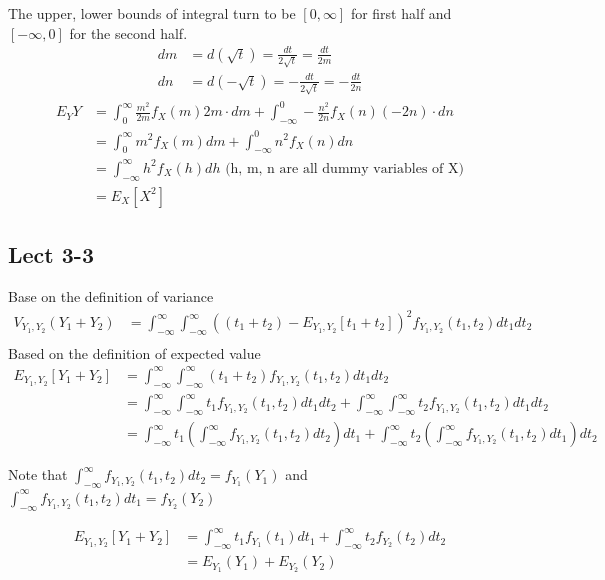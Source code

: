 \documentclass[11pt,letterpaper]{article}
\begin{document}
\noindent The upper, lower bounds of integral turn to be $[0, \infty]$ for first half and $[-\infty,0]$ for the second half.
\begin{align*}
dm &= d(\sqrt{t}) = \frac{dt}{2 \sqrt{t}} = \frac{dt}{2m}\\
dn &= d(-\sqrt{t}) = -\frac{dt}{2 \sqrt{t}} = -\frac{dt}{2n}
\end{align*}
\begin{align*}
E_Y{Y} &= \int^{\infty}_{0} \frac{m^2}{2 m}   f_X(m) 2m \cdot dm + \int_{-\infty}^{0} - \frac{n^2}{2 n}  f_X(n) (-2n) \cdot dn \\
&= \int^{\infty}_{0} m^2 f_X(m) dm + \int_{-\infty}^{0} n^2 f_X(n) dn \\
&= \int^{\infty}_{-\infty} h^2 f_X(h) dh \text{ (h, m, n are all dummy variables of X)} \\
&= E_{X}[X^2]
\end{align*}


\subsection*{Lect 3-3}
Base on the definition of variance
\begin{align*}
V_{Y_1, Y_2}(Y_1 + Y_2) &= \int_{-\infty}^{\infty} \int_{-\infty}^{\infty} ( (t_1 + t_2) - E_{Y_1, Y_2}[t_1 + t_2] )^2 f_{Y_1,Y_2}(t_1, t_2) dt_1 dt_2 \\
\end{align*}
Based on the definition of expected value
\begin{align*}
E_{Y_1, Y_2}[Y_1 + Y_2] &= \int_{-\infty}^{\infty} \int_{-\infty}^{\infty} (t_1 + t_2) f_{Y_1, Y_2}(t_1, t_2) dt_1 dt_2 \\
&= \int_{-\infty}^{\infty} \int_{-\infty}^{\infty} t_1  f_{Y_1, Y_2}(t_1, t_2) dt_1 dt_2 + \int_{-\infty}^{\infty} \int_{-\infty}^{\infty} t_2  f_{Y_1, Y_2}(t_1, t_2) dt_1 dt_2 \\
&= \int_{-\infty}^{\infty} t_1 (\int_{-\infty}^{\infty} f_{Y_1, Y_2}(t_1, t_2) dt_2) dt_1 + \int_{-\infty}^{\infty} t_2 (\int_{-\infty}^{\infty} f_{Y_1, Y_2}(t_1, t_2) dt_1) dt_2
\end{align*}

Note that $\int_{-\infty}^{\infty} f_{Y_1, Y_2}(t_1, t_2) dt_2 = f_{Y_1}(Y_1)$ and $\int_{-\infty}^{\infty} f_{Y_1, Y_2}(t_1, t_2) dt_1 = f_{Y_2}(Y_2)$

\begin{align*}
E_{Y_1, Y_2}[Y_1 + Y_2] &= \int_{-\infty}^{\infty} t_1 f_{Y_1}(t_1) dt_1 +  \int_{-\infty}^{\infty} t_2 f_{Y_2}(t_2) dt_2 \\
&= E_{Y_1}(Y_1) + E_{Y_2}(Y_2)
\end{align*}
\end{document}
